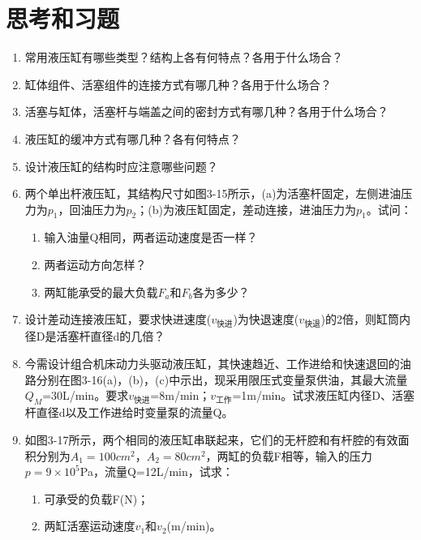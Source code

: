 \section*{思考和习题}
\begin{enumerate}[\hspace{2em}3-1]
 \item 常用液压缸有哪些类型？结构上各有何特点？各用于什么场合？
 \item 缸体组件、活塞组件的连接方式有哪几种？各用于什么场合？
 \item 活塞与缸体，活塞杆与端盖之间的密封方式有哪几种？各用于什么场合？
 \item 液压缸的缓冲方式有哪几种？各有何特点？
 \item 设计液压缸的结构时应注意哪些问题？
 \item 两个单出杆液压缸，其结构尺寸如图3-15所示，(a)为活塞杆固定，左侧进油压力为$p_1$，回油压力为$p_2$；(b)为液压缸固定，差动连接，进油压力为$p_1$。试问：
  \begin{enumerate}[\hspace{2em}(1)]
   \item 输入油量Q相同，两者运动速度是否一样？
   \item 两者运动方向怎样？
   \item 两缸能承受的最大负载$F_a$和$F_b$各为多少？
  \end{enumerate}
 \item 设计差动连接液压缸，要求快进速度($v_{\text {快进}}$)为快退速度($v_{\text {快退}}$)的2倍，则缸筒内径D是活塞杆直径d的几倍？
 \item 今需设计组合机床动力头驱动液压缸，其快速趋近、工作进给和快速退回的油路分别在图3-16(a)，(b)，(c)中示出，现采用限压式变量泵供油，其最大流量$Q_M$=30L/min。要求$v_{\text {快进}}$=8m/min；$v_{\text {工作}}$=1m/min。试求液压缸内径D、活塞杆直径d以及工作进给时变量泵的流量Q。
 \item 如图3-17所示，两个相同的液压缸串联起来，它们的无杆腔和有杆腔的有效面积分别为$A_1=100cm^2$，$A_2=80cm^2$，两缸的负载F相等，输入的压力$p=9\times10^5$Pa，流量Q=12L/min，试求：
  \begin{enumerate}[\hspace{2em}(1)]
   \item 可承受的负载F(N)；
   \item 两缸活塞运动速度$v_1$和$v_2$(m/min)。
  \end{enumerate}
\end{enumerate}


